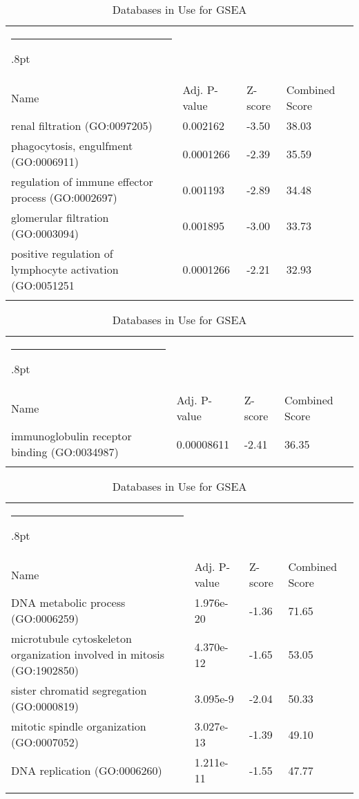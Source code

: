 \documentclass[3p,authoryear,preprint,12pt]{elsarticle}
\makeatletter
\def\hlinewd#1{%
  \noalign{\ifnum0=`}\fi\hrule \@height #1%
  \futurelet\reserved@a\@xhline}
\def\tbltoprule{\hlinewd{.8pt}\\[-12pt]}
\def\tblbottomrule{\noalign{\vspace*{6pt}}\hline\noalign{\vspace*{2pt}}}
\def\tblmidrule{\noalign{\vspace*{6pt}}\hline\noalign{\vspace*{2pt}}}
\makeatother
\begin{document}
\begin{table*}[!htbp]
	\caption{{Databases in Use for GSEA} }
	\label{tw-de478ae31cc6}
	\def\arraystretch{1}
	\ignorespaces 
	\centering 
	\begin{tabulary}{\linewidth}{p{\dimexpr.65\tabcolsep}p{\dimexpr.15\tabcolsep}p{\dimexpr.1\tabcolsep}p{\dimexpr.1\tabcolsep}}
		\tbltoprule Name & Adj. P-value & Z-score & Combined Score\\
		\tblmidrule
renal filtration (GO:0097205) & 0.002162 & -3.50 & 38.03 \\
phagocytosis, engulfment (GO:0006911) & 0.0001266 & -2.39 & 35.59 \\
regulation of immune effector process (GO:0002697) & 0.001193 & -2.89 & 34.48 \\
glomerular filtration (GO:0003094) & 0.001895 & -3.00 & 33.73 \\
positive regulation of lymphocyte activation (GO:0051251 & 0.0001266 & -2.21 & 32.93 \\
		\tblbottomrule
	\end{tabulary}\par 
\end{table*}
\begin{table*}[!htbp]
	\caption{{Databases in Use for GSEA} }
	\label{tw-de478ae31cc6}
	\def\arraystretch{1}
	\ignorespaces 
	\centering 
	\begin{tabulary}{\linewidth}{p{\dimexpr.65\tabcolsep}p{\dimexpr.15\tabcolsep}p{\dimexpr.1\tabcolsep}p{\dimexpr.1\tabcolsep}}
		\tbltoprule Name & Adj. P-value & Z-score & Combined Score\\
		\tblmidrule
immunoglobulin receptor binding (GO:0034987) & 0.00008611 & -2.41 & 36.35 \\
		\tblbottomrule
	\end{tabulary}\par 
\end{table*}
\begin{table*}[!htbp]
	\caption{{Databases in Use for GSEA} }
	\label{tw-de478ae31cc6}
	\def\arraystretch{1}
	\ignorespaces 
	\centering 
	\begin{tabulary}{\linewidth}{p{\dimexpr.65\tabcolsep}p{\dimexpr.15\tabcolsep}p{\dimexpr.1\tabcolsep}p{\dimexpr.1\tabcolsep}}
		\tbltoprule Name & Adj. P-value & Z-score & Combined Score\\
		\tblmidrule
DNA metabolic process (GO:0006259) & 1.976e-20 & -1.36 & 71.65 \\
microtubule cytoskeleton organization involved in mitosis (GO:1902850) & 4.370e-12 & -1.65 & 53.05 \\
sister chromatid segregation (GO:0000819) & 3.095e-9 & -2.04 & 50.33 \\
mitotic spindle organization (GO:0007052) & 3.027e-13 & -1.39 & 49.10 \\
DNA replication (GO:0006260) & 1.211e-11 & -1.55 & 47.77 \\
		\tblbottomrule
	\end{tabulary}\par 
\end{table*}
\end{document}

